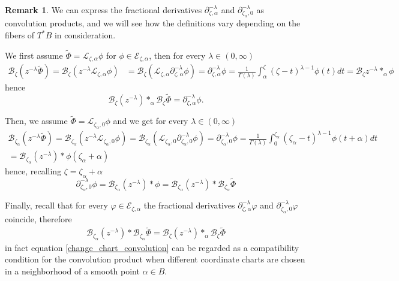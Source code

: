 \documentclass{article}
\theoremstyle{definition}
\newcommand{\series}[1]{\tilde{#1}}
\newcommand{\fracderiv}[3]{\partial^{#1}_{#2, #3}}
\newcommand{\laplace}{\mathcal{L}}
\newcommand{\borel}{\mathcal{B}}
\newtheorem{remark}[definition]{Remark}
\begin{document}
\begin{remark}
We can express the fractional derivatives $\fracderiv{-\lambda}{\zeta}{\alpha}$ and $\fracderiv{-\lambda}{\zeta_\alpha}{0}$ as convolution products, and we will see how the definitions vary depending on the fibers of $T^*B$ in consideration. 

We first assume $\series{\Phi}=\laplace_{\zeta,\alpha}\phi$ for $\phi\in\mathcal{E}_{\zeta,\alpha}$, then for every $\lambda\in (0,\infty)$
\begin{align*}
    \borel_\zeta(z^{-\lambda}\series{\Phi})=\borel_\zeta(z^{-\lambda}\laplace_{\zeta,\alpha}\phi)&=\borel_\zeta(\laplace_{\zeta,\alpha}\partial_{\zeta,\alpha}^{-\lambda}\phi)=\partial_{\zeta,\alpha}^{-\lambda}\phi=\frac{1}{\Gamma(\lambda)}\int_{\alpha}^\zeta (\zeta-t)^{\lambda-1}\phi(t)dt=\borel_\zeta z^{-\lambda}\ast_\alpha\phi
\end{align*}
hence \[\borel_\zeta (z^{-\lambda})\ast_\alpha\borel_\zeta\series{\Phi}=\fracderiv{-\lambda}{\zeta}{\alpha}\phi.\]

Then, we assume $\series{\Phi}=\laplace_{\zeta_\alpha,0}\phi$ and we get for every $\lambda\in (0,\infty)$
\begin{multline*}
    \borel_{\zeta_\alpha}(z^{-\lambda}\series{\Phi})=\borel_{\zeta_\alpha}(z^{-\lambda}\laplace_{\zeta_\alpha,0}\phi)=\borel_{\zeta_\alpha}(\laplace_{\zeta_\alpha,0}\partial_{\zeta_\alpha,0}^{-\lambda}\phi)=\partial_{\zeta_\alpha,0}^{-\lambda}\phi=\frac{1}{\Gamma(\lambda)}\int_{0}^{\zeta_\alpha} (\zeta_\alpha-t)^{\lambda-1}\phi(t+\alpha)dt\\
    =\borel_{\zeta_\alpha}(z^{-\lambda})\ast\phi(\zeta_\alpha+\alpha)
\end{multline*}
hence, recalling $\zeta=\zeta_\alpha+\alpha$ \[\partial_{\zeta_\alpha,0}^{-\lambda}\phi=\borel_{\zeta_\alpha} (z^{-\lambda})\ast\phi=\borel_{\zeta_\alpha} (z^{-\lambda})\ast\borel_{\zeta_\alpha}\series{\Phi}\]

Finally, recall that for every $\varphi\in\mathcal{E}_{\zeta,\alpha}$ the fractional derivatives $\fracderiv{-\lambda}{\zeta}{\alpha}\varphi$ and 
$\fracderiv{-\lambda}{\zeta_\alpha}{0}\varphi$ coincide, therefore 
\begin{align}\label{change_chart_convolution}
    \borel_{\zeta_\alpha} (z^{-\lambda})\ast\borel_{\zeta_\alpha}\series{\Phi}=\borel_\zeta (z^{-\lambda})\ast_\alpha\borel_\zeta\series{\Phi}
\end{align}
in fact equation \eqref{change_chart_convolution} can be regarded as a compatibility condition for the convolution product when different coordinate charts are chosen in a neighborhood of a smooth point $\alpha\in B$.  
\end{remark}
\end{document}
